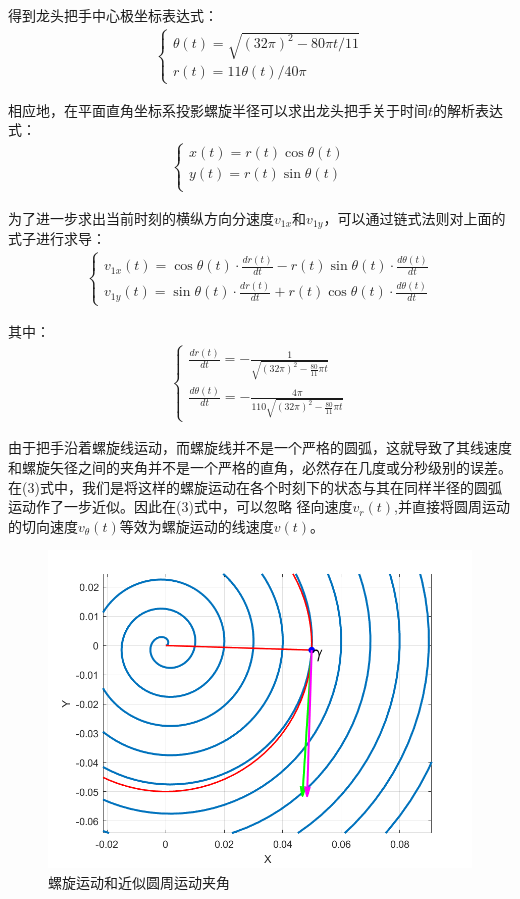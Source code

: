\documentclass{cumcmthesis1}
\begin{document}
得到龙头把手中心极坐标表达式：
\begin{align}
    \begin{cases}
        \theta(t)=\sqrt{(32\pi)^2-80\pi t / 11}\\
        r(t)=11 \theta(t)/40 \pi 
    \end{cases}
\end{align}
\par
相应地，在平面直角坐标系投影螺旋半径可以求出龙头把手关于时间$t$的解析表达式：
\begin{align}
    \begin{cases}
        x(t) = r(t) \cos \theta(t)\\
        y(t) = r(t) \sin \theta(t)\\
    \end{cases}
\end{align}
\par
为了进一步求出当前时刻的横纵方向分速度$v_{1x}$和$v_{1y}$，可以通过链式法则对上面的式子进行求导：
\begin{align}
    \begin{cases}
        v_{1x}(t) = \cos\theta(t) \cdot \frac{dr(t)}{dt} - r(t) \sin\theta(t) \cdot \frac{d\theta(t)}{dt} \\
        v_{1y}(t)= \sin\theta(t) \cdot \frac{dr(t)}{dt} + r(t) \cos\theta(t) \cdot \frac{d\theta(t)}{dt}
    \end{cases}
\end{align}
\par
其中：
\begin{align}
    \begin{cases}
        \frac{dr(t)}{dt} = -\frac{1}{\sqrt{(32\pi)^2 - \frac{80}{11}\pi t}}\\
        \frac{d\theta(t)}{dt} = -\frac{4\pi}{110 \sqrt{(32\pi)^2 - \frac{80}{11}\pi t}}
    \end{cases}
\end{align}
\par
由于把手沿着螺旋线运动，而螺旋线并不是一个严格的圆弧，这就导致了其线速度和螺旋矢径之间的夹角并不是一个严格的直角，必然存在几度或分秒级别的误差。
在(3)式中，我们是将这样的螺旋运动在各个时刻下的状态与其在同样半径的圆弧运动作了一步近似。因此在(3)式中，可以忽略
径向速度$v_r(t)$,并直接将圆周运动的切向速度$v_\theta(t)$等效为螺旋运动的线速度$v(t)$。
\begin{figure}
    \caption{螺旋运动和近似圆周运动夹角}
    \centering    
    \includegraphics[width=0.68\linewidth]{drawing_t1_1.png}
\end{figure}
\end{document}
